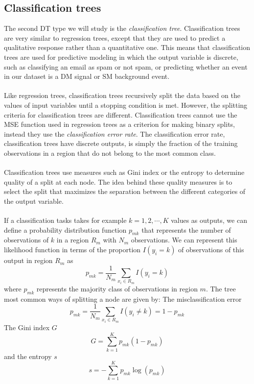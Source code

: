 \documentclass[12pt, a4paper]{book}
\begin{document}
\subsection{Classification trees}
The second DT type we will study is the \textit{classification tree}. Classification trees are very similar to regression trees, except that they are used to predict a qualitative response rather than a quantitative one. This means that classification trees are used for predictive modeling in 
which the output variable is discrete, such as classifying an email as spam or not spam, or predicting whether an event in our dataset is a DM signal or SM background event.\\
\\Like regression trees, classification trees recursively split the data based on the values of input variables until a stopping condition is met. However, the splitting criteria for classification trees are different. Classification trees cannot use the MSE function used in regression trees 
as a criterion for making binary splits, instead they use the \textit{classification error rate}. The classification error rate, classification trees have discrete outputs, is simply the fraction of the training observations in a region that do not belong to the most common class.\\
\\Classification trees use measures such as Gini index or the entropy to determine quality of a split at each node. The idea behind these quality measures is to select the split that maximizes the separation between the different categories of the output variable.\\
\\If a classification tasks takes for example $k=1,2,\cdots,K$ values as outputs, we can define a probability distribution function $p_{mk}$ that represents the number of observations of $k$ in a region $R_m$ with $N_m$ observations. We can represent this likelihood function in terms 
of the proportion $I(y_i=k)$ of observations of this output in region $R_m$ as
$$
p_{mk}=\frac{1}{N_m}\sum_{x_i\in R_m}I(y_i=k)
$$
where $p_{mk}$ represents the majority class of observations in region $m$. The tree most common ways of splitting a node are given by: The misclassification error
$$
p_{mk}=\frac{1}{N_m}\sum_{x_i\in R_m}I(y_i\ne k) = 1-p_{mk}
$$
The Gini index $G$
\begin{equation}\label{eq:gini}
    G=\sum_{k=1}^K p_{mk}(1-p_{mk})
\end{equation}
and the entropy $s$
$$
s=-\sum_{k=1}^K p_{mk}\log(p_{mk})
$$
\end{document}
